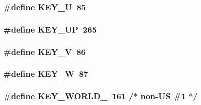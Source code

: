 \hypertarget{group___keys_ga050a6de4c5edb8eb9582c3eb80fed07f}{
\subsubsection[{K\-E\-Y\-\_\-\-U}]{\setlength{\rightskip}{0pt plus 5cm}\#define K\-E\-Y\-\_\-\-U~85}}\label{group___keys_ga050a6de4c5edb8eb9582c3eb80fed07f}
\hypertarget{group___keys_gafa086fc916a81e7fd348ec00cf786916}{
\subsubsection[{K\-E\-Y\-\_\-\-U\-P}]{\setlength{\rightskip}{0pt plus 5cm}\#define K\-E\-Y\-\_\-\-U\-P~265}}\label{group___keys_gafa086fc916a81e7fd348ec00cf786916}
\hypertarget{group___keys_ga1b4a450ef7e51ae0b691dd5489f74535}{
\subsubsection[{K\-E\-Y\-\_\-\-V}]{\setlength{\rightskip}{0pt plus 5cm}\#define K\-E\-Y\-\_\-\-V~86}}\label{group___keys_ga1b4a450ef7e51ae0b691dd5489f74535}
\hypertarget{group___keys_gafdebd5d771ee260c703a74f459767c09}{
\subsubsection[{K\-E\-Y\-\_\-\-W}]{\setlength{\rightskip}{0pt plus 5cm}\#define K\-E\-Y\-\_\-\-W~87}}\label{group___keys_gafdebd5d771ee260c703a74f459767c09}
\hypertarget{group___keys_gadc3ff27f726f48c448302ef601d0db4e}{
\subsubsection[{K\-E\-Y\-\_\-\-W\-O\-R\-L\-D\-\_\-1}]{\setlength{\rightskip}{0pt plus 5cm}\#define K\-E\-Y\-\_\-\-W\-O\-R\-L\-D\-\_~161 /$\ast$ non-\/U\-S \#1 $\ast$/}}\label{group___keys_gadc3ff27f726f48c448302ef601d0db4e}
